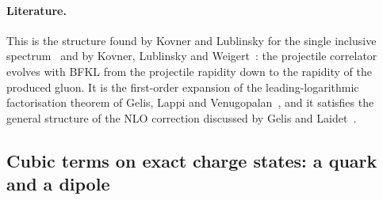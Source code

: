 \paragraph{Literature.} This is the structure found by Kovner and Lublinsky for the single inclusive spectrum~\cite{Kovner:2006wr} and by Kovner, Lublinsky and Weigert~\cite{Kovner:2006ge}: the projectile correlator evolves with BFKL from the projectile rapidity down to the rapidity of the produced gluon. It is the first-order expansion of the leading-logarithmic factorisation theorem of Gelis, Lappi and Venugopalan~\cite{Gelis:2008rw}, and it satisfies the general structure of the NLO correction discussed by Gelis and Laidet~\cite{Gelis:2012ri}.

\subsection{Cubic terms on exact charge states: a quark and a dipole}\label{sec:check_cubic}

